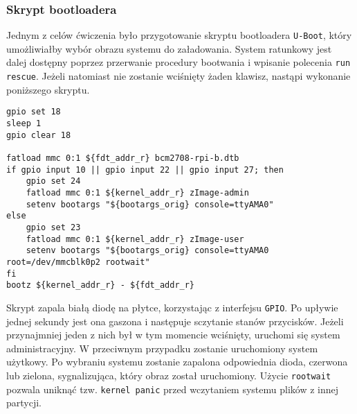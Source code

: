 \documentclass[10pt,a4paper]{article}
\begin{document}
\subsubsection{Skrypt bootloadera}
Jednym z celów ćwiczenia było przygotowanie skryptu bootloadera \texttt{U-Boot}, który umożliwiałby wybór obrazu systemu do załadowania. System ratunkowy jest dalej dostępny poprzez przerwanie procedury bootwania i wpisanie polecenia \texttt{run rescue}. Jeżeli natomiast nie zostanie wciśnięty żaden klawisz, nastąpi wykonanie poniższego skryptu.
\begin{lstlisting}[style=bash, caption={Zawartość pliku boot.script}]
gpio set 18
sleep 1
gpio clear 18

fatload mmc 0:1 ${fdt_addr_r} bcm2708-rpi-b.dtb
if gpio input 10 || gpio input 22 || gpio input 27; then
	gpio set 24
	fatload mmc 0:1 ${kernel_addr_r} zImage-admin
	setenv bootargs "${bootargs_orig} console=ttyAMA0"
else
	gpio set 23
	fatload mmc 0:1 ${kernel_addr_r} zImage-user
	setenv bootargs "${bootargs_orig} console=ttyAMA0 root=/dev/mmcblk0p2 rootwait"
fi
bootz ${kernel_addr_r} - ${fdt_addr_r}
\end{lstlisting}
Skrypt zapala białą diodę na płytce, korzystając z interfejsu \texttt{GPIO}. Po upływie jednej sekundy jest ona gaszona i następuje sczytanie stanów przycisków. Jeżeli przynajmniej jeden z nich był w tym momencie wciśnięty, uruchomi się system administracyjny. W przeciwnym przypadku zostanie uruchomiony system użytkowy. Po wybraniu systemu zostanie zapalona odpowiednia dioda, czerwona lub zielona, sygnalizująca, który obraz został uruchomiony. Użycie \texttt{rootwait} pozwala uniknąć tzw. \texttt{kernel panic} przed wczytaniem systemu plików z innej partycji. 
\end{document}
